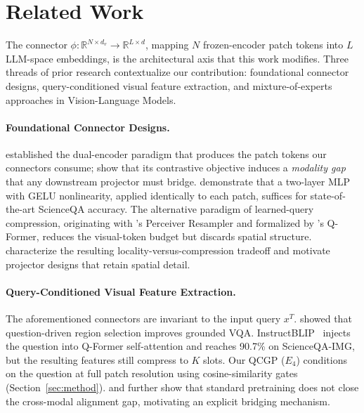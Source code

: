 \documentclass{article}
\begin{document}
\section{Related Work}
\label{sec:relwork}

The connector $\phi\colon \mathbb{R}^{N \times d_v} \to \mathbb{R}^{L \times d}$, mapping $N$ frozen-encoder patch tokens into $L$ LLM-space embeddings, is the architectural axis that this work modifies. Three threads of prior research contextualize our contribution: foundational connector designs, query-conditioned visual feature extraction, and mixture-of-experts approaches in Vision-Language Models.

\paragraph{Foundational Connector Designs.}
\citet{radford2021clip} established the dual-encoder paradigm that produces the patch tokens our connectors consume; \citet{liang2022modgap} show that its contrastive objective induces a \emph{modality gap} that any downstream projector must bridge. \citet{liu2024llava} demonstrate that a two-layer MLP with GELU nonlinearity, applied identically to each patch, suffices for state-of-the-art ScienceQA accuracy. The alternative paradigm of learned-query compression, originating with \citet{alayrac2022flamingo}'s Perceiver Resampler and formalized by \citet{li2023blip2}'s Q-Former, reduces the visual-token budget but discards spatial structure. \citet{cha2024honeybee} characterize the resulting locality-versus-compression tradeoff and motivate projector designs that retain spatial detail.

\paragraph{Query-Conditioned Visual Feature Extraction.}
The aforementioned connectors are invariant to the input query $x^T$. \citet{ilievski2016fda} showed that question-driven region selection improves grounded VQA. InstructBLIP~\citep{dai2023instructblip} injects the question into Q-Former self-attention and reaches 90.7\% on ScienceQA-IMG, but the resulting features still compress to $K$ slots. Our QCGP ($E_4$) conditions on the question at full patch resolution using cosine-similarity gates (Section~\ref{sec:method}). \citet{zhang2025sail} and \citet{zou2026vlsa} further show that standard pretraining does not close the cross-modal alignment gap, motivating an explicit bridging mechanism.
\end{document}
